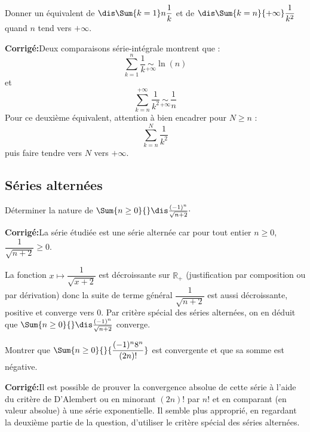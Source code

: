 \documentclass[a4paper,twoside,french,10pt]{VcCours}
\newcommand{\corr}{\textbf{Corrigé:}}
\begin{document}
\medskip

\begin{Exercice}{}\label{harm} Donner un équivalent de $\dis \Sum{k=1}n \dfrac{1}{k}$ et de $\dis \Sum{k=n}{+ \infty} \dfrac{1}{k^2}$ quand $n$ tend vers $+ \infty$.
\end{Exercice} 

\corr Deux comparaisons série-intégrale montrent que :
$$ \sum_{k=1}^n \dfrac{1}{k} \underset{+ \infty}{\sim} \ln(n) $$
et 
$$ \sum_{k=n}^{+ \infty} \dfrac{1}{k^2} \underset{+ \infty}{\sim} \dfrac{1}{n} $$
Pour ce deuxième équivalent, attention à bien encadrer pour $N \geq n$ :
$$ \sum_{k=n}^N \dfrac{1}{k^2}$$
puis faire tendre vers $N$ vers $+ \infty$.

\medskip

\subsection{Séries alternées}

\medskip

\begin{Exercice}{} Déterminer la nature de $\Sum{n \geq 0}{} \dis\frac{(-1)^n}{\sqrt{n+2}}\cdot$
\end{Exercice}

\corr La série étudiée est une série alternée car pour tout entier $n \geq 0$, $\dfrac{1}{\sqrt{n+2}} \geq 0$.


\noindent La fonction $x \mapsto \dfrac{1}{\sqrt{x+2}}$ est décroissante sur $\mathbb{R}_+$ (justification par composition ou par dérivation) donc la suite de terme général $\dfrac{1}{\sqrt{n+2}}$ est aussi décroissante, positive et converge vers $0$. Par critère spécial des séries alternées, on en déduit que $\Sum{n \geq 0}{} \dis\frac{(-1)^n}{\sqrt{n+2}}$ converge.

\medskip

\begin{Exercice}{} Montrer que $\Sum{n \geq 0}{} {\dfrac{( - 1)^n 8^n}{(2n)!}}$ est convergente et que sa somme est négative. \end{Exercice}

\corr Il est possible de prouver la convergence absolue de cette série à l'aide du critère de D'Alembert ou en minorant $(2n)!$ par $n!$ et en comparant (en valeur absolue) à une série exponentielle. Il semble plus approprié, en regardant la deuxième partie de la question, d'utiliser le critère spécial des séries alternées.

\medskip
\end{document}
